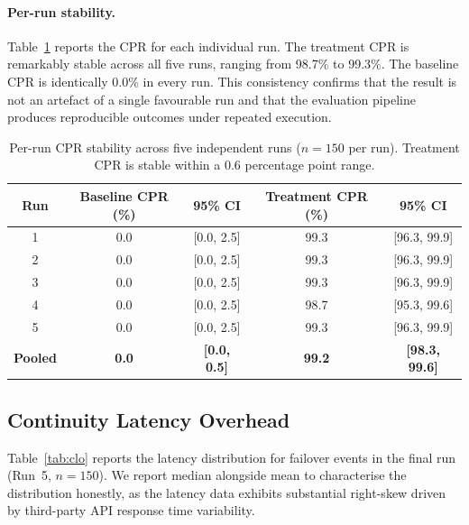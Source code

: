 \paragraph{Per-run stability.}
Table~\ref{tab:cpr_per_run} reports the CPR for each individual run. The treatment CPR is remarkably stable across all five runs, ranging from 98.7\% to 99.3\%. The baseline CPR is identically 0.0\% in every run. This consistency confirms that the result is not an artefact of a single favourable run and that the evaluation pipeline produces reproducible outcomes under repeated execution.

\begin{table}[t]
\centering
\caption{Per-run CPR stability across five independent runs ($n = 150$ per run). Treatment CPR is stable within a 0.6 percentage point range.}
\label{tab:cpr_per_run}
\small
\begin{tabular}{ccccc}
\toprule
\textbf{Run} & \textbf{Baseline CPR (\%)} & \textbf{95\% CI} & \textbf{Treatment CPR (\%)} & \textbf{95\% CI} \\
\midrule
1 & 0.0 & [0.0, 2.5] & 99.3 & [96.3, 99.9] \\
2 & 0.0 & [0.0, 2.5] & 99.3 & [96.3, 99.9] \\
3 & 0.0 & [0.0, 2.5] & 99.3 & [96.3, 99.9] \\
4 & 0.0 & [0.0, 2.5] & 98.7 & [95.3, 99.6] \\
5 & 0.0 & [0.0, 2.5] & 99.3 & [96.3, 99.9] \\
\midrule
\textbf{Pooled} & \textbf{0.0} & \textbf{[0.0, 0.5]} & \textbf{99.2} & \textbf{[98.3, 99.6]} \\
\bottomrule
\end{tabular}
\end{table}

\subsection{Continuity Latency Overhead}

Table~\ref{tab:clo} reports the latency distribution for failover events in the final run (Run~5, $n = 150$). We report median alongside mean to characterise the distribution honestly, as the latency data exhibits substantial right-skew driven by third-party API response time variability.

